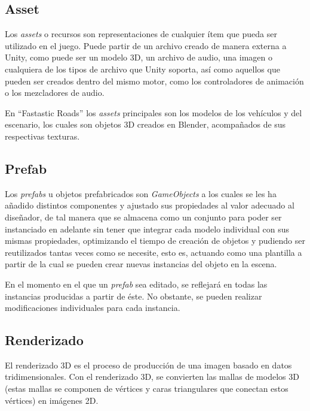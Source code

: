 \subsection{Asset}

Los \textit{assets} o recursos son representaciones de cualquier ítem que pueda ser utilizado en el juego. Puede partir de un archivo creado de manera externa a Unity, como puede ser un modelo 3D, un archivo de audio, una imagen o cualquiera de los tipos de archivo que Unity soporta, así como aquellos que pueden ser creados dentro del mismo motor, como los controladores de animación o los mezcladores de audio.

En ``Fastastic Roads'' los \textit{assets} principales son los modelos de los vehículos y del escenario, los cuales son objetos 3D creados en Blender, acompañados de sus respectivas texturas.

\subsection{Prefab}

Los \textit{prefabs} u objetos prefabricados son \textit{GameObjects} a los cuales se les ha añadido distintos componentes y ajustado sus propiedades al valor adecuado al diseñador, de tal manera que se almacena como un conjunto para poder ser instanciado en adelante sin tener que integrar cada modelo individual con sus mismas propiedades, optimizando el tiempo de creación de objetos y pudiendo ser reutilizados tantas veces como se necesite, esto es, actuando como una plantilla a partir de la cual se pueden crear nuevas instancias del objeto en la escena.

En el momento en el que un \textit{prefab} sea editado, se reflejará en todas las instancias producidas a partir de éste. No obstante, se pueden realizar modificaciones individuales para cada instancia.

\subsection{Renderizado}

El renderizado 3D es el proceso de producción de una imagen basado en datos tridimensionales. Con el renderizado 3D, se convierten las mallas de modelos 3D (estas mallas se componen de vértices y caras triangulares que conectan estos vértices) en imágenes 2D. 

